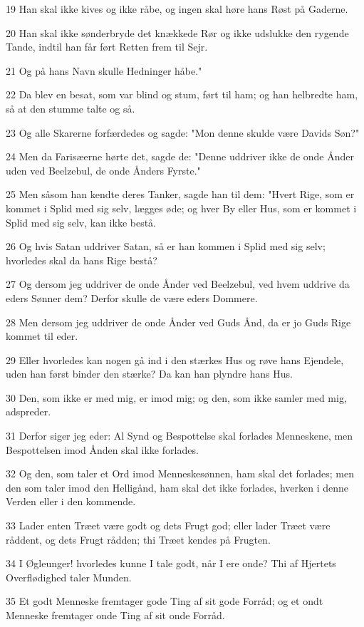 \par 19 Han skal ikke kives og ikke råbe, og ingen skal høre hans Røst på Gaderne.
\par 20 Han skal ikke sønderbryde det knækkede Rør og ikke udslukke den rygende Tande, indtil han får ført Retten frem til Sejr.
\par 21 Og på hans Navn skulle Hedninger håbe."
\par 22 Da blev en besat, som var blind og stum, ført til ham; og han helbredte ham, så at den stumme talte og så.
\par 23 Og alle Skarerne forfærdedes og sagde: "Mon denne skulde være Davids Søn?"
\par 24 Men da Farisæerne hørte det, sagde de: "Denne uddriver ikke de onde Ånder uden ved Beelzebul, de onde Ånders Fyrste."
\par 25 Men såsom han kendte deres Tanker, sagde han til dem: "Hvert Rige, som er kommet i Splid med sig selv, lægges øde; og hver By eller Hus, som er kommet i Splid med sig selv, kan ikke bestå.
\par 26 Og hvis Satan uddriver Satan, så er han kommen i Splid med sig selv; hvorledes skal da hans Rige bestå?
\par 27 Og dersom jeg uddriver de onde Ånder ved Beelzebul, ved hvem uddrive da eders Sønner dem? Derfor skulle de være eders Dommere.
\par 28 Men dersom jeg uddriver de onde Ånder ved Guds Ånd, da er jo Guds Rige kommet til eder.
\par 29 Eller hvorledes kan nogen gå ind i den stærkes Hus og røve hans Ejendele, uden han først binder den stærke? Da kan han plyndre hans Hus.
\par 30 Den, som ikke er med mig, er imod mig; og den, som ikke samler med mig, adspreder.
\par 31 Derfor siger jeg eder: Al Synd og Bespottelse skal forlades Menneskene, men Bespottelsen imod Ånden skal ikke forlades.
\par 32 Og den, som taler et Ord imod Menneskesønnen, ham skal det forlades; men den som taler imod den Helligånd, ham skal det ikke forlades, hverken i denne Verden eller i den kommende.
\par 33 Lader enten Træet være godt og dets Frugt god; eller lader Træet være råddent, og dets Frugt rådden; thi Træet kendes på Frugten.
\par 34 I Øgleunger! hvorledes kunne I tale godt, når I ere onde? Thi af Hjertets Overflødighed taler Munden.
\par 35 Et godt Menneske fremtager gode Ting af sit gode Forråd; og et ondt Menneske fremtager onde Ting af sit onde Forråd.

